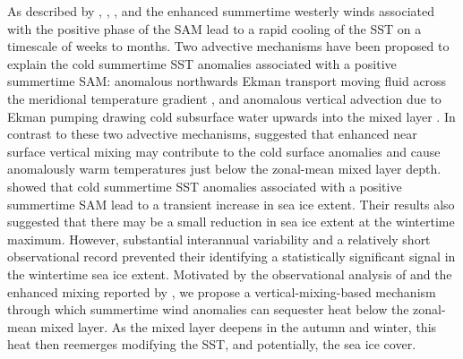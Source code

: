 \documentclass{ametsocV5}
\begin{document}
As described by \citet{Doddridge2017}, \citet{Ferreira2015}, \citet{Kostov2017}, and \citet{Purich2016} the enhanced summertime westerly winds associated with the positive phase of the SAM lead to a rapid cooling of the SST on a timescale of weeks to months. Two advective mechanisms have been proposed to explain the cold summertime SST anomalies associated with a positive summertime SAM: anomalous northwards Ekman transport moving fluid across the meridional temperature gradient \citep{Ferreira2015,Kostov2017}, and anomalous vertical advection due to Ekman pumping drawing cold subsurface water upwards into the mixed layer \citep{Purich2016}. In contrast to these two advective mechanisms, \citet{Doddridge2019a} suggested that enhanced near surface vertical mixing may contribute to the cold surface anomalies and cause anomalously warm temperatures just below the zonal-mean mixed layer depth. \citet{Doddridge2017} showed that cold summertime SST anomalies associated with a positive summertime SAM lead to a transient increase in sea ice extent. Their results also suggested that there may be a small reduction in sea ice extent at the wintertime maximum. However, substantial interannual variability and a relatively short observational record prevented their identifying a statistically significant signal in the wintertime sea ice extent. Motivated by the observational analysis of \citet{Doddridge2017} and the enhanced mixing reported by \citet{Doddridge2019a}, we propose a vertical-mixing-based mechanism through which summertime wind anomalies can sequester heat below the zonal-mean mixed layer. As the mixed layer deepens in the autumn and winter, this heat then reemerges modifying the SST, and potentially, the sea ice cover.






\end{document}
